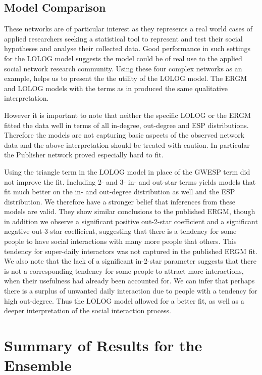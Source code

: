 \documentclass[
]{statsoc}
\begin{document}
\subsection{Model Comparison}

These networks are of particular interest as they represents a real
world cases of applied researchers seeking a statistical tool to
represent and test their social hypotheses and analyse their collected
data. Good performance in such settings for the LOLOG model suggests the
model could be of real use to the applied social network research
community. Using these four complex networks as an example, helps us to
present the the utility of the LOLOG model. The ERGM and LOLOG models
with the terms as in \cite{Sailer2012} produced the same qualitative
interpretation.

However it is important to note that neither the specific LOLOG or the
ERGM fitted the data well in terms of all in-degree, out-degree and ESP
distributions. Therefore the models are not capturing basic aspects of
the observed network data and the above interpretation should be treated
with caution. In particular the Publisher network proved especially hard
to fit.

Using the triangle term in the LOLOG model in place of the GWESP term
did not improve the fit. Including 2- and 3- in- and out-star terms
yields models that fit much better on the in- and out-degree
distribution as well and the ESP distribution. We therefore have a
stronger belief that inferences from these models are valid. They show
similar conclusions to the published ERGM, though in addition we observe
a significant positive out-2-star coefficient and a significant negative
out-3-star coefficient, suggesting that there is a tendency for some
people to have social interactions with many more people that others.
This tendency for super-daily interactors was not captured in the
published ERGM fit. We also note that the lack of a significant
in-2-star parameter suggests that there is not a corresponding tendency
for some people to attract more interactions, when their usefulness had
already been accounted for. We can infer that perhaps there is a surplus
of unwanted daily interaction due to people with a tendency for high
out-degree. Thus the LOLOG model allowed for a better fit, as well as a
deeper interpretation of the social interaction process.

\section{Summary of Results for the Ensemble}\label{sec:results}
\end{document}
